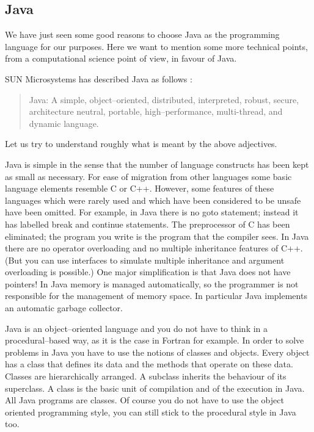 \subsection{Java}
\label{sec:Java}

We have just seen some good reasons to choose Java as the programming language
for our purposes. Here we want to mention some more technical points, from a 
computational science point of view, in favour of Java.

SUN Microsystems has described Java as follows \cite[]{javanutshell}:
\begin{quote}
Java: A simple, object--oriented, distributed, interpreted, robust, secure,
architecture neutral, portable, high--performance, multi-thread, and dynamic 
language.
\end{quote}
Let us try to understand roughly what is meant by the above adjectives.

Java is simple in the sense that the number of language constructs has been 
kept as small as necessary. For ease of migration from other languages some
basic language elements resemble C or C++. However, some features of these 
languages which were rarely used and which have been considered to be unsafe 
have been omitted. For example, in Java there is no goto statement; instead 
it has labelled break and continue statements. The preprocessor of C has been 
eliminated; the program you write is the program that the compiler sees. In 
Java there are no  operator overloading and no multiple inheritance 
features of C++. (But you can use interfaces to simulate multiple inheritance
and argument overloading is possible.)
One major simplification is that Java does not have pointers!
In Java memory is managed automatically, so the programmer is not responsible 
for the management  of memory space. In particular Java implements an 
automatic  garbage collector.

Java is an object--oriented language and you do not have to think in a 
procedural--based way, as it is the case in Fortran for example. In order to 
solve problems in Java you have to use the notions of classes and objects. 
Every object has a class that defines its data and the methods that operate 
on these data. Classes are hierarchically arranged. A subclass inherits the 
behaviour of its superclass. A class is the basic unit of compilation
and of the execution in Java. All Java programs are classes.
Of course you do not have to use the object oriented programming style,
you can still stick to the procedural style in Java too.

